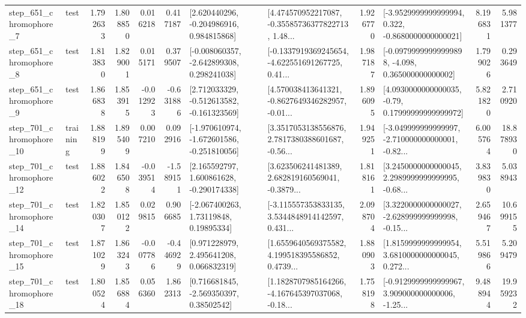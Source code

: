 \begin{tabular}{llrrrrllrlrr}
   step\_651\_chromophore\_7 &      test &      1.792633 &    1.808850 &      0.016218 &  0.417187 &    [2.620440296, -0.204986916, 0.984815868] &  [4.474570952217087, -0.35585736377822713, 1.48... &       1.926770 &  [-3.9529999999999994, 0.322, -0.8680000000000021] &            8.196831 &          5.981377 \\
   step\_651\_chromophore\_8 &      test &      1.813830 &    1.829001 &      0.015171 &  0.379507 &   [-0.008060357, -2.642899308, 0.298241038] &  [-0.1337919369245654, -4.622551691267725, 0.41... &       1.987187 &  [-0.09799999999999898, -4.098, 0.365000000000002] &            1.799026 &          0.293649 \\
   step\_651\_chromophore\_9 &      test &      1.866838 &    1.853915 &     -0.012923 & -0.631886 &   [2.712033329, -0.512613582, -0.161323569] &  [4.570038413641321, -0.8627649346282957, -0.01... &       1.896095 &   [4.0930000000000035, -0.79, 0.17999999999999972] &            5.821820 &          2.710920 \\
  step\_701\_chromophore\_10 &  training &      1.888199 &    1.895409 &      0.007210 &  0.092916 &  [-1.970610974, -1.672601586, -0.251810056] &  [3.3517053138556876, 2.7817380388601687, -0.56... &       1.949251 &  [-3.049999999999997, -2.710000000000001, -0.82... &            6.005764 &         18.878930 \\
  step\_701\_chromophore\_12 &      test &      1.886022 &    1.846508 &     -0.039514 & -1.589151 &    [2.165592797, 1.600861628, -0.290174338] &  [3.623506241481389, 2.682819160569041, -0.3879... &       1.818161 &  [3.2450000000000045, 2.2989999999999995, -0.68... &            3.839830 &          5.038943 \\
  step\_701\_chromophore\_14 &      test &      1.820307 &    1.850122 &      0.029815 &  0.906685 &      [-2.067400263, 1.73119848, 0.19895334] &  [-3.115557353833135, 3.5344848914142597, 0.431... &       2.098704 &  [3.3220000000000027, -2.628999999999998, -0.15... &            2.659467 &         10.699155 \\
  step\_701\_chromophore\_15 &      test &      1.871029 &    1.863243 &     -0.007786 & -0.446929 &     [0.971228979, 2.495641208, 0.066832319] &  [1.6559640569375582, 4.199518395586852, 0.4739... &       1.880903 &  [1.8159999999999954, 3.6810000000000045, 0.272... &            5.519866 &          5.209479 \\
  step\_701\_chromophore\_18 &      test &      1.800524 &    1.856884 &      0.056360 &  1.862313 &     [0.716681845, -2.569350397, 0.38502542] &  [1.1828707985164266, -4.167645397037068, -0.18... &       1.758198 &  [-0.9129999999999967, 3.909000000000006, -1.25... &            9.488944 &         19.959232 \\

\end{tabular}
